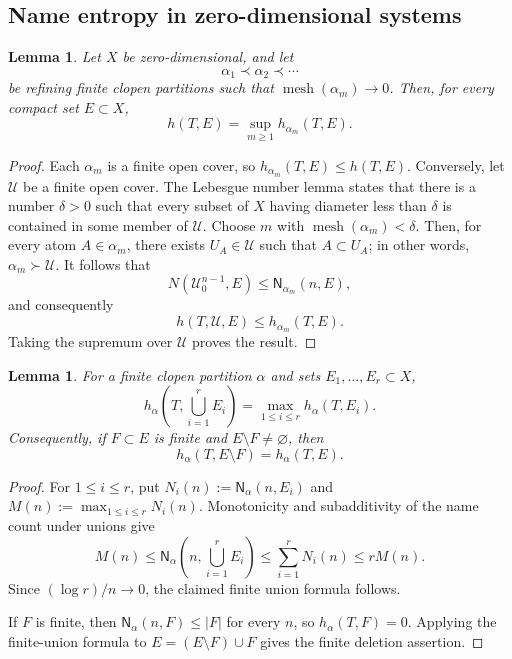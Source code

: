 \documentclass[10pt,a4paper]{amsart}
\newcommand{\cU}{\mathcal U}
\newcommand{\mesh}{\operatorname{mesh}}
\newcommand{\Nname}{\mathsf N}
\newtheorem{lemma}[theorem]{Lemma}
\numberwithin{equation}{section}
\begin{document}
	\subsection{Name entropy in zero-dimensional systems}
	\label{sec:name-entropy}
	
	\begin{lemma}
		\label{lem:clopen-detects}
		Let $X$ be zero-dimensional, and let
		\[
		\alpha_1\prec\alpha_2\prec\cdots
		\]
		be refining finite clopen partitions such that
		$\mesh(\alpha_m)\to0$. Then, for every compact set $E\subset X$,
		\[
		h(T,E)=\sup_{m\geq1}h_{\alpha_m}(T,E).
		\]
	\end{lemma}
	
	\begin{proof}
		Each $\alpha_m$ is a finite open cover, so
		$h_{\alpha_m}(T,E)\leq h(T,E)$.  Conversely, let $\cU$ be a finite open
		cover.  The Lebesgue number lemma states that there is a number $\delta>0$
		such that every subset of $X$ having diameter less than $\delta$ is contained
		in some member of $\cU$.  Choose $m$ with $\mesh(\alpha_m)<\delta$.  Then,
		for every atom $A\in\alpha_m$, there exists $U_A\in\cU$ such that
		$A\subset U_A$; in other words, $\alpha_m\succ\cU$.  It follows that
		\[
			N(\cU_0^{n-1},E)
			\leq
			\Nname_{\alpha_m}(n,E),
		\]
		and consequently
		\[
		h(T,\cU,E)\leq h_{\alpha_m}(T,E).
		\]
		Taking the supremum over $\cU$ proves the result.
	\end{proof}
	
	\begin{lemma}
		\label{lem:finite-union}
		For a finite clopen partition $\alpha$ and sets $E_1,\ldots,E_r\subset X$,
		\[
		h_\alpha\left(T,\bigcup_{i=1}^rE_i\right)
		=
		\max_{1\leq i\leq r}h_\alpha(T,E_i).
		\]
		Consequently, if $F\subset E$ is finite and $E\setminus F\neq\varnothing$,
		then
		\[
		h_\alpha(T,E\setminus F)=h_\alpha(T,E).
		\]
	\end{lemma}
	
	\begin{proof}
		For $1\leq i\leq r$, put
		$N_i(n):=\Nname_\alpha(n,E_i)$ and
		$M(n):=\max_{1\leq i\leq r}N_i(n)$.  Monotonicity and subadditivity of the
		name count under unions give
		\[
		M(n)
		\leq
		\Nname_\alpha\left(n,\bigcup_{i=1}^rE_i\right)
		\leq
		\sum_{i=1}^rN_i(n)
		\leq
		rM(n).
		\]
		Since $(\log r)/n\to0$, the claimed finite union formula follows.

		If $F$ is finite, then $\Nname_\alpha(n,F)\leq|F|$ for every $n$, so
		$h_\alpha(T,F)=0$.  Applying the finite-union formula to
		$E=(E\setminus F)\cup F$ gives the finite deletion assertion.
	\end{proof}
	
\end{document}
